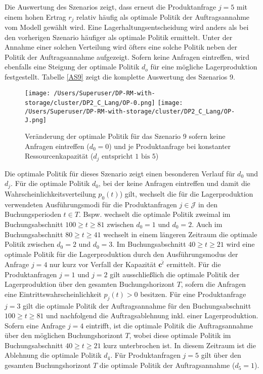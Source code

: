 Die Auswertung des Szenarios zeigt, dass erneut die Produktanfrage $j=5$ mit einem hohen Ertrag $r_j$ relativ häufig als optimale Politik der Auftragsannahme vom Modell gewählt wird. Eine Lagerhaltungsentscheidung wird anders als bei den vorherigen Szenario häufiger als optimale Politik ermittelt. Unter der Annahme einer solchen Verteilung wird öfters eine solche Politik neben der Politik der Auftragsannahme aufgezeigt. Sofern keine Anfragen eintreffen, wird ebenfalls eine Steigung der optimale Politik $d_o$ für eine mögliche Lagerproduktion festgestellt. Tabelle \ref{AS9} zeigt die komplette Auswertung des Szenarios 9.

\begin{figure}[h!]     
\begin{center}
\texttt{[image: /Users/Superuser/DP-RM-with-storage/cluster/DP2\_C\_Lang/OP-0.png]}
\texttt{[image: /Users/Superuser/DP-RM-with-storage/cluster/DP2\_C\_Lang/OP-J.png]}
    \caption{Veränderung der optimale Politik für das Szenario 9 sofern keine Anfragen eintreffen ($d_0=0$) und je Produktanfrage bei konstanter Ressourcenkapazität ($d_j\text{ entspricht }1\text{ bis }5$)}  \label{SV9}
  \end{center}
\end{figure}

Die optimale Politik für dieses Szenario zeigt einen besonderen Verlauf für $d_0$ und $d_j$. Für die optimale Politik $d_0$, bei der keine Anfragen eintreffen und damit die Wahrscheinlichkeitsverteilung $p_0(t)$) gilt, wechselt die für die Lagerproduktion verwendeten Ausführungsmodi für die Produktanfragen $j\in\mathcal{J}$ in den Buchungsperioden $ t \in T$. Bspw. wechselt die optimale Politik zweimal im Buchungsabschnitt $100\ge t\ge81$ zwischen $d_0=1$ und $d_0=2$. Auch im Buchungsabschnitt $80\ge t\ge41$ wechselt in einem längeren Zeitraum die optimale Politik zwischen $d_0=2$ und $d_0=3$. Im Buchungsabschnitt $40\ge t\ge21$ wird eine optimale Politik für die Lagerproduktion durch den Ausführungsmodus der Anfrage $j=4$ nur kurz vor Verfall der Kapazität $\textbf{c}^{\hat t}$ ermittelt. Für die Produktanfragen $j=1$ und $j=2$ gilt ausschließlich die optimale Politik der Lagerproduktion über den gesamten Buchungshorizont $T$, sofern die Anfragen eine Eintrittswahrscheinlichkeit $p_j(t)>0$ besitzen. Für eine Produktanfrage $j=3$ gilt die optimale Politik der Auftragsannahme für den Buchungsabschnitt $100\ge t\ge81$ und nachfolgend die Auftragsablehnung inkl. einer Lagerproduktion. Sofern eine Anfrage $j=4$ eintrifft, ist die optimale Politik die Auftragsannahme über den möglichen Buchungshorizont $T$, wobei diese optimale Politik im Buchungsabschnitt $40\ge t\ge21$ kurz unterbrochen ist. In diesem Zeitraum ist die Ablehnung die optimale Politik $d_4$. Für Produktanfragen $j=5$ gilt über den gesamten Buchungshorizont $T$ die optimale Politik der Auftragsannahme ($d_5=1$). 




